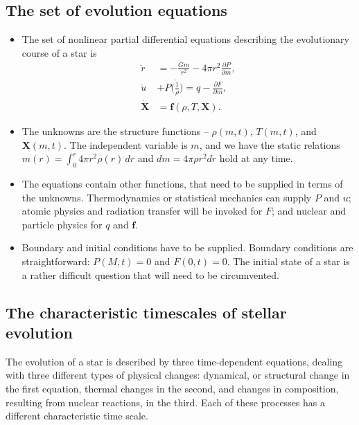 \documentclass[10pt,amsmath,amssymb,aps,pra]{revtex4-2}
\newcommand{\V}[1]{\mathbf{#1}}
\newcommand{\di}{\partial} %
\begin{document}
\subsection{The set of evolution equations}
\begin{itemize}
\item The set of nonlinear partial differential equations describing the
evolutionary course of a star is
\begin{subequations}
\begin{align}\label{eq:set}
\ddot{r} &= -\frac{Gm}{r^2}-4\pi{r}^2\frac{\di{P}}{\di{m}},\\
\dot{u} &+ P\dot{\biggl(\frac{1}{\rho}\biggr)} = q - \frac{\di{F}}{\di{m}},\\
\dot{\V{X}} &= \V{f}(\rho,T,\V{X}).
\end{align}
\end{subequations}

\item The unknowns are the structure functions -- $\rho(m,t)$, $T(m,t)$, and
$\V{X}(m,t)$. The independent variable is $m$, and we have the static relations
$m(r)=\int_0^r4\pi{}r^2\rho(r)\,dr$ and $dm=4\pi\rho{}r^2dr$ hold at any time.

\item The equations contain other functions, that need to be supplied in terms
of the unknowns. Thermodynamics or statistical mechanics can supply $P$ and $u$;
atomic physics and radiation transfer will be invoked for $F$; and nuclear and
particle physics for $q$ and $\V{f}$.

\item Boundary and initial conditions have to be supplied. Boundary conditions
are straightforward: $P(M,t)=0$ and $F(0,t)=0$. The initial state of a star is a
rather difficult question that will need to be circumvented.
\end{itemize}

\subsection{The characteristic timescales of stellar evolution}
The evolution of a star is described by three time-dependent equations, dealing
with three different types of physical changes: dynamical, or structural change
in the first equation, thermal changes in the second, and changes in
composition, resulting from nuclear reactions, in the third. Each of these
processes has a different characteristic time scale.
\end{document}
